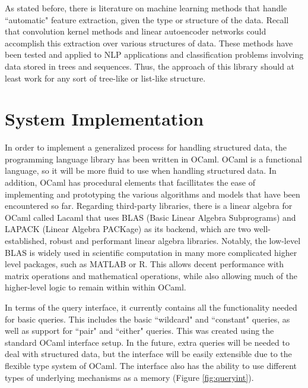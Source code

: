\documentclass{sig-alternate}
\begin{document}
As stated before, there is literature on machine learning methods that handle ``automatic" feature 
extraction, given the type or structure of the data. Recall that convolution kernel methods and 
linear autoencoder networks could accomplish this extraction over various structures of data. These 
methods have been tested and applied to NLP applications and classification problems involving data 
stored in trees and sequences.  Thus, the approach of this library should at least work for any sort 
of tree-like or list-like structure.


\section{System Implementation}
\label{sec:sysimp}

In order to implement a generalized process for handling structured data, the programming language 
library has been written in OCaml. OCaml is a functional language, so it will be more fluid to use 
when handling structured data. In addition, OCaml has procedural elements that facillitates the ease 
of implementing and prototyping the various algorithms and models that have been encountered so far. 
Regarding third-party libraries, there is a linear algebra for OCaml called Lacaml that uses BLAS 
(Basic Linear Algebra Subprograms)
and LAPACK (Linear Algebra PACKage)
as its backend, which are two well-established, robust and performant linear algebra 
libraries. Notably, the low-level BLAS is widely used in scientific computation in many more complicated
higher level packages, such as MATLAB or R. This allows decent performance with matrix operations
and mathematical operations, while also allowing
much of the higher-level logic to remain within within OCaml.

In terms of the query interface, it currently contains all the functionality needed for basic 
queries.  This includes the basic ``wildcard" and ``constant" queries, as well as support for 
``pair" and ``either" queries. This was created using the standard OCaml interface setup. In the 
future, extra queries will be needed to deal with structured data, but the interface will be easily 
extensible due to the flexible type system of OCaml. The interface also has the ability to use 
different types of underlying mechanisms as a memory (Figure \ref{fig:queryint}).
\end{document}
